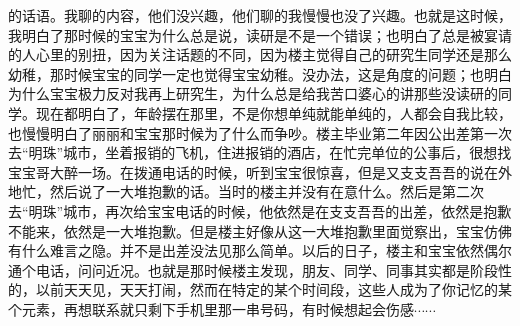 的话语。我聊的内容，他们没兴趣，他们聊的我慢慢也没了兴趣。也就是这时候，我明白了那时候的宝宝为什么总是说，读研是不是一个错误；也明白了总是被宴请的人心里的别扭，因为关注话题的不同，因为楼主觉得自己的研究生同学还是那么幼稚，那时候宝宝的同学一定也觉得宝宝幼稚。没办法，这是角度的问题；也明白为什么宝宝极力反对我再上研究生，为什么总是给我苦口婆心的讲那些没读研的同学。现在都明白了，年龄摆在那里，不是你想单纯就能单纯的，人都会自我比较，也慢慢明白了丽丽和宝宝那时候为了什么而争吵。楼主毕业第二年因公出差第一次去“明珠”城市，坐着报销的飞机，住进报销的酒店，在忙完单位的公事后，很想找宝宝哥大醉一场。在拨通电话的时候，听到宝宝很惊喜，但是又支支吾吾的说在外地忙，然后说了一大堆抱歉的话。当时的楼主并没有在意什么。然后是第二次去“明珠”城市，再次给宝宝电话的时候，他依然是在支支吾吾的出差，依然是抱歉不能来，依然是一大堆抱歉。但是楼主好像从这一大堆抱歉里面觉察出，宝宝仿佛有什么难言之隐。并不是出差没法见那么简单。以后的日子，楼主和宝宝依然偶尔通个电话，问问近况。也就是那时候楼主发现，朋友、同学、同事其实都是阶段性的，以前天天见，天天打闹，然而在特定的某个时间段，这些人成为了你记忆的某个元素，再想联系就只剩下手机里那一串号码，有时候想起会伤感$\cdots\cdots$

